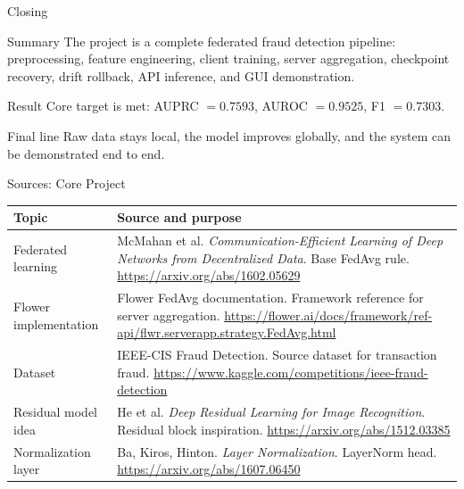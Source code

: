 \documentclass[aspectratio=169,10pt]{beamer}
\newcommand{\bestAUPRC}{0.7593}
\newcommand{\bestAUROC}{0.9525}
\newcommand{\bestFone}{0.7303}
\begin{document}
\begin{frame}{Closing}
  \begin{block}{Summary}
    The project is a complete federated fraud detection pipeline:
    preprocessing, feature engineering, client training, server aggregation,
    checkpoint recovery, drift rollback, API inference, and GUI demonstration.
  \end{block}
  \begin{block}{Result}
    Core target is met: AUPRC \(=\bestAUPRC\), AUROC \(=\bestAUROC\), F1 \(=\bestFone\).
  \end{block}
  \begin{block}{Final line}
    Raw data stays local, the model improves globally, and the system can be demonstrated end to end.
  \end{block}
\end{frame}

\begin{frame}{Sources: Core Project}
  \small
  \begin{tabular}{p{}p{}}
    \toprule
    Topic & Source and purpose \\
    \midrule
    Federated learning &
    McMahan et al. \textit{Communication-Efficient Learning of Deep Networks from Decentralized Data}. Base FedAvg rule. \url{https://arxiv.org/abs/1602.05629} \\
    Flower implementation &
    Flower FedAvg documentation. Framework reference for server aggregation. \url{https://flower.ai/docs/framework/ref-api/flwr.serverapp.strategy.FedAvg.html} \\
    Dataset &
    IEEE-CIS Fraud Detection. Source dataset for transaction fraud. \url{https://www.kaggle.com/competitions/ieee-fraud-detection} \\
    Residual model idea &
    He et al. \textit{Deep Residual Learning for Image Recognition}. Residual block inspiration. \url{https://arxiv.org/abs/1512.03385} \\
    Normalization layer &
    Ba, Kiros, Hinton. \textit{Layer Normalization}. LayerNorm head. \url{https://arxiv.org/abs/1607.06450} \\
    \bottomrule
  \end{tabular}
\end{frame}
\end{document}
